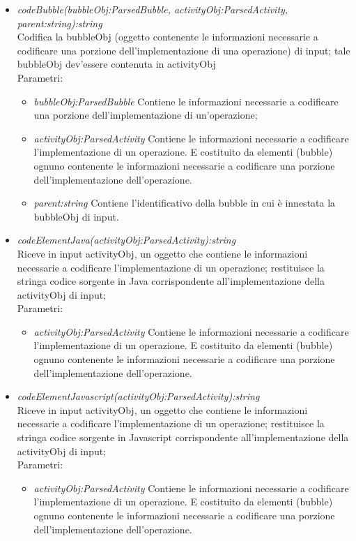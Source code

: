 \documentclass[../DefinizioneDiProdotto.tex]{subfiles}
\begin{document}
\begin{itemize}
\begin{itemize}
					\item \emph{codeBubble(bubbleObj:ParsedBubble, activityObj:ParsedActivity, parent:string):string} \\ 
					Codifica la bubbleObj (oggetto contenente le informazioni necessarie a codificare una porzione dell'implementazione di una operazione) di input; tale bubbleObj dev'essere contenuta in activityObj \\
					Parametri:
					\begin{itemize}
						\item \emph{bubbleObj:ParsedBubble} Contiene le informazioni necessarie a codificare una porzione dell'implementazione di un'operazione;
						\item \emph{activityObj:ParsedActivity} Contiene le informazioni necessarie a codificare l'implementazione di un operazione. E costituito da elementi (bubble) ognuno contenente le informazioni necessarie a codificare una porzione dell'implementazione dell'operazione.
						\item \emph{parent:string} Contiene l'identificativo della bubble in cui è innestata la bubbleObj di input.
					\end{itemize}
					
					\item \emph{codeElementJava(activityObj:ParsedActivity):string} \\ 
					Riceve in input activityObj, un oggetto che contiene le informazioni necessarie a codificare l'implementazione di un operazione; 
					restituisce la stringa codice sorgente in Java corrispondente all'implementazione della activityObj di input; \\
					Parametri:
					\begin{itemize}
						\item \emph{activityObj:ParsedActivity} Contiene le informazioni necessarie a codificare l'implementazione di un operazione. E costituito da elementi (bubble) ognuno contenente le informazioni necessarie a codificare una porzione dell'implementazione dell'operazione.
					\end{itemize}
					
					
					\item \emph{codeElementJavascript(activityObj:ParsedActivity):string} \\ 
					Riceve in input activityObj, un oggetto che contiene le informazioni necessarie a codificare l'implementazione di un operazione; 
					restituisce la stringa codice sorgente in Javascript corrispondente all'implementazione della activityObj di input; \\
					Parametri:
					\begin{itemize}
						\item \emph{activityObj:ParsedActivity} Contiene le informazioni necessarie a codificare l'implementazione di un operazione. E costituito da elementi (bubble) ognuno contenente le informazioni necessarie a codificare una porzione dell'implementazione dell'operazione.
					\end{itemize}
				\end{itemize}
				

\end{itemize}
\end{document}
